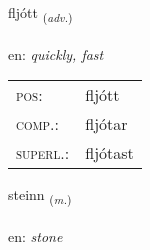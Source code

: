 \documentclass[frontgrid, backgrid]{flacards}\usepackage[]{graphicx}\usepackage[]{color}
\begin{document}
\renewcommand{\flhead}{\vskip5pt \fboxsep=0pt {\small\bfseries\footnotesize Atviksorð | Adverb}}
\renewcommand{\fcfoot}{\vskip5pt \fboxsep=0pt \hspace{2pt}{\small\bfseries\footnotesize 2K}}

\renewcommand{\blhead}{\vskip5pt {\small\bfseries\footnotesize Atviksorð | Adverb }}
\renewcommand{\bcfoot}{\vskip5pt \hspace{2pt}{\small\bfseries\footnotesize 2K}}


{fljótt \small{\textsubscript{(\textit{adv.})}} \\[1ex] %
\textphonetic{[fljouht]} \\
en: \emph{quickly, fast} \\  [2ex]
\renewcommand*{\arraystretch}{0.8}
\begin{tabular}{ll}
\textsc{pos}: & fljótt \\ 
\textsc{comp.}: & fljótar \\ 
\textsc{superl.}: & fljótast \\
\end{tabular}
}

\renewcommand{\flhead}{\vskip5pt \fboxsep=0pt {\small\bfseries\footnotesize Nafnorð | Noun}}
\renewcommand{\fcfoot}{\vskip5pt \fboxsep=0pt \hspace{2pt}{\small\bfseries\footnotesize 2K}}

\renewcommand{\blhead}{\vskip5pt {\small\bfseries\footnotesize Nafnorð | Noun }}
\renewcommand{\bcfoot}{\vskip5pt \hspace{2pt}{\small\bfseries\footnotesize 2K}}


{steinn \small{\textsubscript{(\textit{m.})}} \\[1ex] %
\textphonetic{[steitn̥]} \\
en: \emph{stone} \\  [2ex]
\renewcommand*{\arraystretch}{0.8}
}
\end{document}
